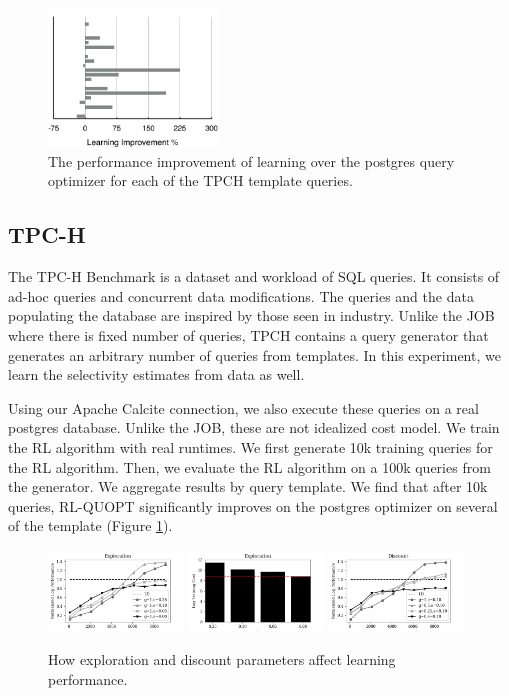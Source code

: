 \begin{figure}[t]
\centering
\includegraphics[width=0.4\textwidth]{sql-experiments/tpch.pdf}
\caption{The performance improvement of learning over the postgres query optimizer for each of the TPCH template queries. \label{tpch}}
\end{figure}

\subsection*{TPC-H}
The TPC-H Benchmark is a dataset and workload of SQL queries. It consists of ad-hoc queries and concurrent data modifications. The queries and the data populating the database are inspired by those seen in industry. Unlike the JOB where there is fixed number of queries, TPCH contains a query generator that generates an arbitrary number of queries from templates. In this experiment, we learn the selectivity estimates from data as well.

Using our Apache Calcite connection, we also execute these queries on a real postgres database. Unlike the JOB, these are not idealized cost model. We train the RL algorithm with real runtimes. We first generate 10k training queries for the RL algorithm. Then, we evaluate the RL algorithm on a 100k queries from the generator. We aggregate results by query template. We find that after 10k queries, RL-QUOPT significantly improves on the postgres optimizer on several of the template (Figure \ref{tpch}).

\begin{figure}[t]
\centering
\includegraphics[width=0.32\textwidth]{sql-experiments/exploration-performance.png}
\includegraphics[width=0.32\textwidth]{sql-experiments/exploration2.png}
\includegraphics[width=0.32\textwidth]{sql-experiments/discount.png}
\caption{How exploration and discount parameters affect learning performance. \label{exp}}
\end{figure}


